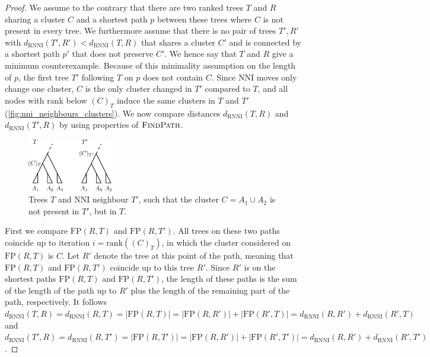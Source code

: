 \documentclass[11pt]{amsart}
\newcommand{\rnni}{\mathrm{RNNI}}
\newcommand{\findpath}{\textsc{FindPath}}
\newcommand{\rank}{\mathrm{rank}}
\newcommand{\nni}{\mathrm{NNI}}
\newcommand{\fp}{\mathrm{FP}}
\begin{document}
\begin{proof}
	We assume to the contrary that there are two ranked trees $T$ and $R$ sharing a cluster $C$ and a shortest path $p$ between these trees where $C$ is not present in every tree.
	We furthermore assume that there is no pair of trees $T',R'$ with $d_{\rnni}(T',R') < d_{\rnni}(T,R)$ that shares a cluster $C'$ and is connected by a shortest path $p'$ that does not preserve $C'$.
	We hence say that $T$ and $R$ give a minimum counterexample.
	Because of this minimality assumption on the length of $p$, the first tree $T'$ following $T$ on $p$ does not contain $C$.
	Since $\nni$ moves only change one cluster, $C$ is the only cluster changed in $T'$ compared to $T$, and all nodes with rank below $(C)_T$ induce the same clusters in $T$ and $T'$ (\autoref{fig:nni_neighbours_clusters}).
	We now compare distances $d_{\rnni}(T,R)$ and $d_{\rnni}(T',R)$ by using properties of $\findpath$.

	\begin{figure}[ht]
		\includegraphics[width=0.33\textwidth]{nni_neighbours_clusters.eps}
		\caption{Trees $T$ and $\nni$ neighbour $T'$, such that the cluster $C = A_1 \cup A_2$ is not present in $T'$, but in $T$.}
		\label{fig:nni_neighbours_clusters}
	\end{figure}

	First we compare $\fp(R,T)$ and $\fp(R,T')$.
	All trees on these two paths coincide up to iteration $i = \rank((C)_T)$, in which the cluster considered on $\fp(R,T)$ is $C$.
	Let $R'$ denote the tree at this point of the path, meaning that $\fp(R,T)$ and $\fp(R,T')$ coincide up to this tree $R'$.
	Since $R'$ is on the shortest paths $\fp(R,T)$ and $\fp(R,T')$, the length of these paths is the sum of the length of the path up to $R'$ plus the length of the remaining part of the path, respectively.
	It follows $d_{\rnni}(T,R) = d_{\rnni}(R,T) = |\fp(R,T)| = |\fp(R,R')| + |\fp(R',T)| = d_{\rnni}(R,R') + d_{\rnni}(R', T)$ and $d_{\rnni}(T',R) = d_{\rnni}(R,T') = |\fp(R,T')| = |\fp(R,R')| + |\fp(R',T')| =  d_{\rnni}(R,R') + d_{\rnni}(R', T')$.


\end{proof}
\end{document}
